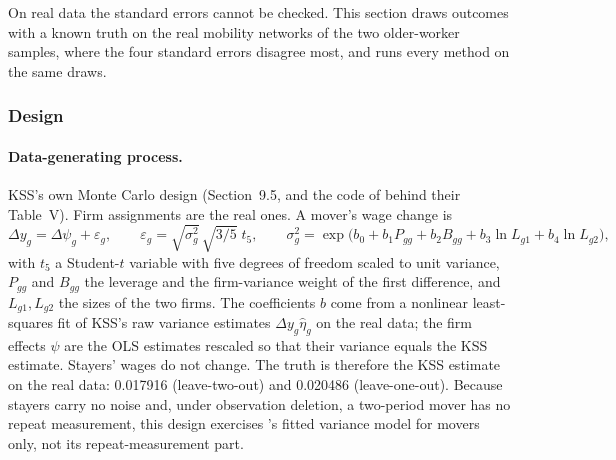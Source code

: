 
On real data the standard errors cannot be checked. This section draws outcomes with a known truth on the real
mobility networks of the two older-worker samples, where the four standard errors disagree most, and runs
every method on the same draws.

\subsubsection{Design}\label{kss:sec:synth-design}

\paragraph{Data-generating process.} KSS's own Monte Carlo design (Section~9.5, and the code of
 behind their Table~V). Firm assignments are the real ones. A mover's wage change is
\[
\Delta y_g=\Delta\psi_g+\varepsilon_g,\qquad
\varepsilon_g=\sqrt{\sigma_g^2}\,\sqrt{3/5}\;t_5 ,\qquad
\sigma_g^2=\exp\!\big(b_0+b_1P_{gg}+b_2B_{gg}+b_3\ln L_{g1}+b_4\ln L_{g2}\big),
\]
with $t_5$ a Student-$t$ variable with five degrees of freedom scaled to unit variance, $P_{gg}$ and $B_{gg}$
the leverage and the firm-variance weight of the first difference, and $L_{g1},L_{g2}$ the sizes of the two
firms. The coefficients $b$ come from a nonlinear least-squares fit of KSS's raw variance estimates
$\Delta y_g\hat\eta_g$ on the real data; the firm effects $\psi$ are the OLS estimates rescaled so that their
variance equals the KSS estimate. Stayers' wages do not change. The truth is therefore the KSS estimate on the
real data: 0.017916 (leave-two-out) and 0.020486 (leave-one-out). Because stayers carry no noise and, under
observation deletion, a two-period mover has no repeat measurement, this design exercises \fevc's fitted
variance model for movers only, not its repeat-measurement part.

